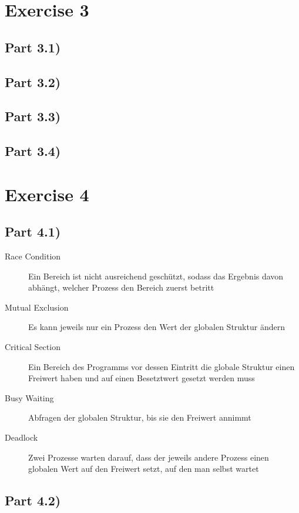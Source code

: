 \documentclass[10pt,a4paper]{article}
\begin{document}
\section*{Exercise 3}

\subsection*{Part 3.1)}

\subsection*{Part 3.2)}

\subsection*{Part 3.3)}

\subsection*{Part 3.4)}

\section*{Exercise 4}

\subsection*{Part 4.1)}

\begin{description}
\item[Race Condition] Ein Bereich ist nicht ausreichend geschützt, sodass das Ergebnis davon abhängt, welcher Prozess den Bereich zuerst betritt
\item[Mutual Exclusion] Es kann jeweils nur ein Prozess den Wert der globalen Struktur ändern
\item[Critical Section] Ein Bereich des Programms vor dessen Eintritt die globale Struktur einen Freiwert haben und auf einen Besetztwert gesetzt werden muss
\item[Busy Waiting] Abfragen der globalen Struktur, bis sie den Freiwert annimmt
\item[Deadlock] Zwei Prozesse warten darauf, dass der jeweils andere Prozess einen globalen Wert auf den Freiwert setzt, auf den man selbst wartet
\end{description}

\subsection*{Part 4.2)}
\end{document}
